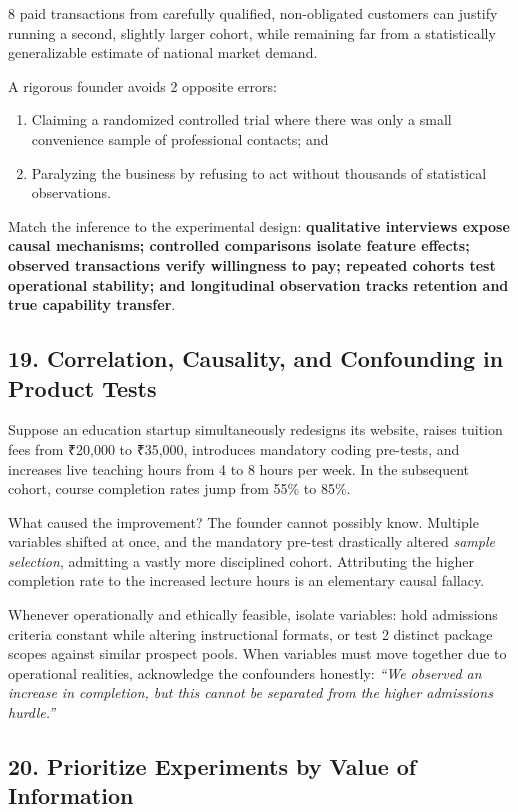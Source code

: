 8 paid transactions from carefully qualified, non-obligated customers can justify running a second, slightly larger cohort, while remaining far from a statistically generalizable estimate of national market demand.

A rigorous founder avoids 2 opposite errors:
\begin{enumerate}
    \item Claiming a randomized controlled trial where there was only a small convenience sample of professional contacts; and
    \item Paralyzing the business by refusing to act without thousands of statistical observations.
\end{enumerate}

Match the inference to the experimental design: \textbf{qualitative interviews expose causal mechanisms; controlled comparisons isolate feature effects; observed transactions verify willingness to pay; repeated cohorts test operational stability; and longitudinal observation tracks retention and true capability transfer}.

\subsection*{19. Correlation, Causality, and Confounding in Product Tests}

Suppose an education startup simultaneously redesigns its website, raises tuition fees from ₹20,000 to ₹35,000, introduces mandatory coding pre-tests, and increases live teaching hours from 4 to 8 hours per week. In the subsequent cohort, course completion rates jump from 55\% to 85\%.

What caused the improvement? The founder cannot possibly know. Multiple variables shifted at once, and the mandatory pre-test drastically altered \emph{sample selection}, admitting a vastly more disciplined cohort. Attributing the higher completion rate to the increased lecture hours is an elementary causal fallacy.

Whenever operationally and ethically feasible, isolate variables: hold admissions criteria constant while altering instructional formats, or test 2 distinct package scopes against similar prospect pools. When variables must move together due to operational realities, acknowledge the confounders honestly: \emph{``We observed an increase in completion, but this cannot be separated from the higher admissions hurdle.''}

\subsection*{20. Prioritize Experiments by Value of Information}

